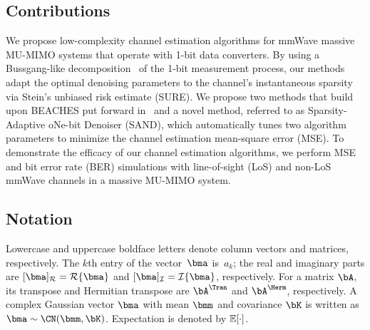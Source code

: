 \subsection{Contributions}
%
We propose low-complexity channel estimation algorithms for mmWave massive MU-MIMO systems that operate with 1-bit data converters.
%
By using a Bussgang-like decomposition~\cite{bussgang52a} of the 1-bit measurement process, our methods adapt the optimal denoising parameters to the channel's instantaneous sparsity via Stein's unbiased risk estimate (SURE).
%
We propose two methods that build upon BEACHES put forward in~\cite{ghods19a} and a novel method, referred to as Sparsity-Adaptive oNe-bit Denoiser (SAND), which automatically tunes two algorithm parameters to minimize the channel estimation mean-square error (MSE). 
%
To demonstrate the efficacy of our channel estimation algorithms, we perform  MSE and bit error rate (BER) simulations with  line-of-sight (LoS) and non-LoS mmWave channels in a massive MU-MIMO system. 

\subsection{Notation}
%
Lowercase and uppercase boldface letters denote column vectors and matrices, respectively. 
%
The $k$th entry of the vector~$\bma$ is~$a_k$; 
the real and imaginary parts are $\realindex{\bma} = \realpart{\bma}$ and $\imagindex{\bma} = \imagpart{\bma}$, respectively. 
For a matrix $\bA$, 
its transpose and Hermitian transpose are $\bA^\Tran$ and $\bA^\Herm$, respectively. 
A complex Gaussian vector $\bma$ with mean $\bmm$ and covariance $\bK$ is written as $\bma\sim\CN(\bmm, \bK)$.
%
Expectation is denoted by $\mathbb{E}[\cdot]$. 
%